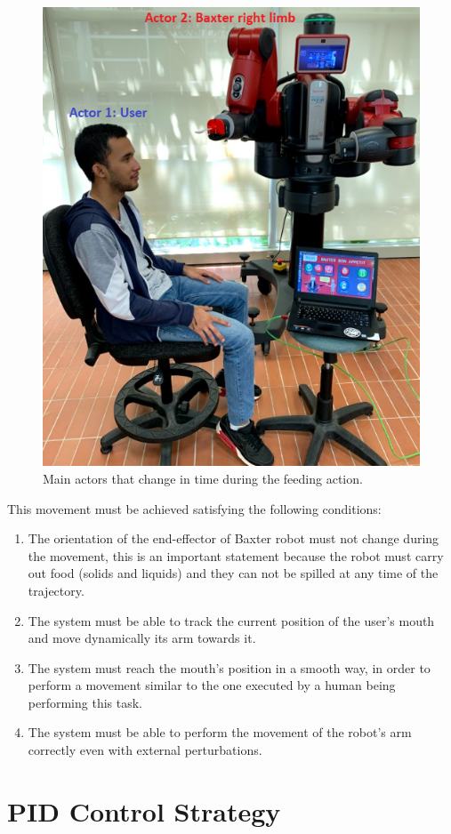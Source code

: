 \documentclass[11pt]{report} %
\begin{document}
\begin{figure}[H]
    \centering
    \includegraphics[width=0.7\linewidth]{assets/imgs/control_theory/control_theory_main_actors.png}
    \caption{Main actors that change in time during the feeding action.} 
    \label{fig_main_actors_control_theory}
\end{figure}

This movement must be achieved satisfying  the following conditions:

\begin{enumerate}
    \item The orientation of the end-effector of Baxter robot must not change during the movement, this is an important statement because the robot must carry out food (solids and liquids) and they can not be spilled at any time of the trajectory.
    \item The system must be able to track the current position of the user's mouth and move dynamically its arm towards it.
    \item The system must reach the mouth's position in a smooth way, in order to perform a movement similar to the one executed by a human being performing this task.
    \item The system must be able to perform the movement of the robot's arm  correctly even with external perturbations.
\end{enumerate}


\section{PID Control Strategy}
\end{document}
